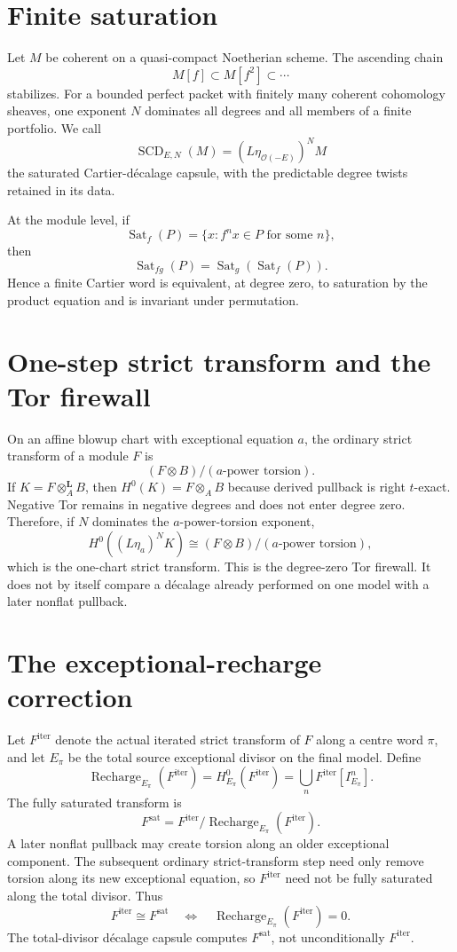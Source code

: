 \documentclass[11pt]{amsart}
\begin{document}
\section{Finite saturation}
Let $M$ be coherent on a quasi-compact Noetherian scheme.  The ascending chain
\[
 M[f]\subset M[f^2]\subset\cdots
\]
stabilizes.  For a bounded perfect packet with finitely many coherent
cohomology sheaves, one exponent $N$ dominates all degrees and all members of a
finite portfolio.  We call
\[
 \operatorname{SCD}_{E,N}(M)=(L\eta_{\mathcal O(-E)})^NM
\]
the saturated Cartier-d\'ecalage capsule, with the predictable degree twists
retained in its data.

At the module level, if
\[
 \operatorname{Sat}_f(P)=\{x:f^nx\in P\text{ for some }n\},
\]
then
\[
 \operatorname{Sat}_{fg}(P)
 =\operatorname{Sat}_g(\operatorname{Sat}_f(P)).
\]
Hence a finite Cartier word is equivalent, at degree zero, to saturation by the
product equation and is invariant under permutation.

\section{One-step strict transform and the Tor firewall}
On an affine blowup chart with exceptional equation $a$, the ordinary strict
transform of a module $F$ is
\[
 (F\otimes B)/(a\text{-power torsion}).
\]
If $K=F\otimes_A^{\mathbf L}B$, then $H^0(K)=F\otimes_A B$ because derived
pullback is right $t$-exact.  Negative Tor remains in negative degrees and does
not enter degree zero.  Therefore, if $N$ dominates the $a$-power-torsion
exponent,
\[
 H^0((L\eta_a)^NK)
 \cong (F\otimes B)/(a\text{-power torsion}),
\]
which is the one-chart strict transform.  This is the degree-zero Tor
firewall.  It does not by itself compare a d\'ecalage already performed on one
model with a later nonflat pullback.

\section{The exceptional-recharge correction}
Let $F^{\mathrm{iter}}$ denote the actual iterated strict transform of $F$ along
a centre word $\pi$, and let $E_\pi$ be the total source exceptional divisor on
the final model.  Define
\[
 \operatorname{Recharge}_{E_\pi}(F^{\mathrm{iter}})
 =H^0_{E_\pi}(F^{\mathrm{iter}})
 =\bigcup_nF^{\mathrm{iter}}[I_{E_\pi}^n].
\]
The fully saturated transform is
\[
 F^{\mathrm{sat}}
 =F^{\mathrm{iter}}/
   \operatorname{Recharge}_{E_\pi}(F^{\mathrm{iter}}).
\]
A later nonflat pullback may create torsion along an older exceptional
component.  The subsequent ordinary strict-transform step need only remove
torsion along its new exceptional equation, so $F^{\mathrm{iter}}$ need not be
fully saturated along the total divisor.  Thus
\[
 F^{\mathrm{iter}}\cong F^{\mathrm{sat}}
 \quad\Longleftrightarrow\quad
 \operatorname{Recharge}_{E_\pi}(F^{\mathrm{iter}})=0.
\]
The total-divisor d\'ecalage capsule computes $F^{\mathrm{sat}}$, not
unconditionally $F^{\mathrm{iter}}$.
\end{document}
